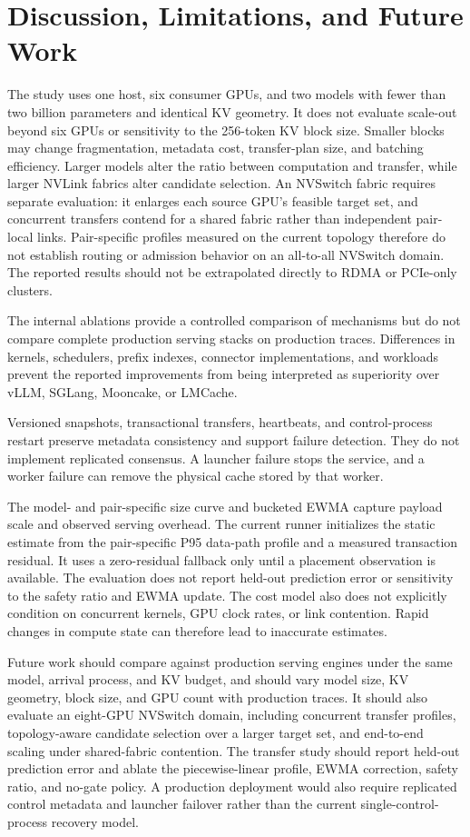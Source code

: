 \documentclass{article}
\begin{document}
\section{Discussion, Limitations, and Future Work}
\label{sec:limitations}

The study uses one host, six consumer GPUs, and two models with fewer than two billion parameters and identical KV geometry. It does not evaluate scale-out beyond six GPUs or sensitivity to the 256-token KV block size. Smaller blocks may change fragmentation, metadata cost, transfer-plan size, and batching efficiency. Larger models alter the ratio between computation and transfer, while larger NVLink fabrics alter candidate selection.
An NVSwitch fabric requires separate evaluation: it enlarges each source GPU's feasible target set, and concurrent transfers contend for a shared fabric rather than independent pair-local links. Pair-specific profiles measured on the current topology therefore do not establish routing or admission behavior on an all-to-all NVSwitch domain.
The reported results should not be extrapolated directly to RDMA or PCIe-only clusters.

The internal ablations provide a controlled comparison of mechanisms but do not compare complete production serving stacks on production traces. Differences in kernels, schedulers, prefix indexes, connector implementations, and workloads prevent the reported improvements from being interpreted as superiority over vLLM, SGLang, Mooncake, or LMCache.

Versioned snapshots, transactional transfers, heartbeats, and control-process restart preserve metadata consistency and support failure detection. They do not implement replicated consensus. A launcher failure stops the service, and a worker failure can remove the physical cache stored by that worker.

The model- and pair-specific size curve and bucketed EWMA capture payload scale and observed serving overhead. The current runner initializes the static estimate from the pair-specific P95 data-path profile and a measured transaction residual. It uses a zero-residual fallback only until a placement observation is available. The evaluation does not report held-out prediction error or sensitivity to the safety ratio and EWMA update. The cost model also does not explicitly condition on concurrent kernels, GPU clock rates, or link contention. Rapid changes in compute state can therefore lead to inaccurate estimates.

Future work should compare against production serving engines under the same model, arrival process, and KV budget, and should vary model size, KV geometry, block size, and GPU count with production traces.
It should also evaluate an eight-GPU NVSwitch domain, including concurrent transfer profiles, topology-aware candidate selection over a larger target set, and end-to-end scaling under shared-fabric contention.
The transfer study should report held-out prediction error and ablate the piecewise-linear profile, EWMA correction, safety ratio, and no-gate policy. A production deployment would also require replicated control metadata and launcher failover rather than the current single-control-process recovery model.
\end{document}
